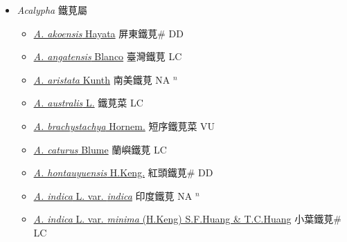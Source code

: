 
  \begin{itemize}
 \item[] \textit{Acalypha} 鐵莧屬
                    
  \begin{itemize}
        \item[] \href{http://www.theplantlist.org/tpl1.1/search?q=Acalypha+akoensis}{\textit{A. akoensis} Hayata}   屏東鐵莧\# DD
        \item[] \href{http://www.theplantlist.org/tpl1.1/search?q=Acalypha+angatensis}{\textit{A. angatensis} Blanco}   臺灣鐵莧 LC
        \item[] \href{http://www.theplantlist.org/tpl1.1/search?q=Acalypha+aristata}{\textit{A. aristata} Kunth}   南美鐵莧 NA $^n$
        \item[] \href{http://www.theplantlist.org/tpl1.1/search?q=Acalypha+australis}{\textit{A. australis} L.}   鐵莧菜 LC
        \item[] \href{http://www.theplantlist.org/tpl1.1/search?q=Acalypha+brachystachya}{\textit{A. brachystachya} Hornem.}   短序鐵莧菜 VU
        \item[] \href{http://www.theplantlist.org/tpl1.1/search?q=Acalypha+caturus}{\textit{A. caturus} Blume}   蘭嶼鐵莧 LC
        \item[] \href{http://www.theplantlist.org/tpl1.1/search?q=Acalypha+hontauyuensis}{\textit{A. hontauyuensis} H.Keng.}   紅頭鐵莧\# DD
        \item[] \href{http://www.theplantlist.org/tpl1.1/search?q=Acalypha+indica+var.+indica}{\textit{A. indica} L. var. \textit{indica}}   印度鐵莧 NA $^n$
        \item[] \href{http://www.theplantlist.org/tpl1.1/search?q=Acalypha+indica+var.+minima}{\textit{A. indica} L. var. \textit{minima} (H.Keng) S.F.Huang \& T.C.Huang}   小葉鐵莧\# LC

\end{itemize}
\end{itemize}
